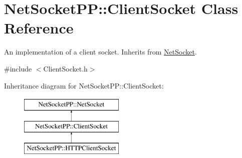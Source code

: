 \hypertarget{class_net_socket_p_p_1_1_client_socket}{\section{Net\-Socket\-P\-P\-:\-:Client\-Socket Class Reference}
\label{class_net_socket_p_p_1_1_client_socket}
}


An implementation of a client socket. Inherits from \hyperlink{class_net_socket_p_p_1_1_net_socket}{Net\-Socket}.  




{\ttfamily \#include $<$Client\-Socket.\-h$>$}

Inheritance diagram for Net\-Socket\-P\-P\-:\-:Client\-Socket\-:\begin{figure}[H]
\begin{center}
\leavevmode
\includegraphics[height=3.000000cm]{class_net_socket_p_p_1_1_client_socket}
\end{center}
\end{figure}
